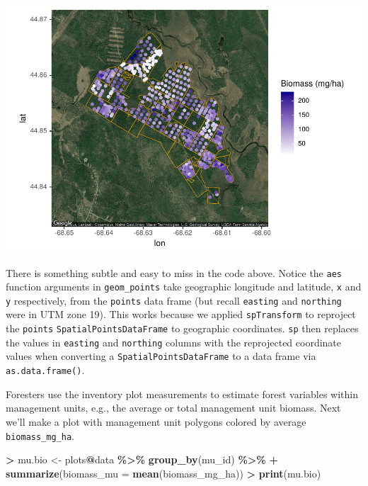 \documentclass[
]{krantz}
\makeatletter
\newenvironment{Shaded}{\begin{snugshade}}{\end{snugshade}}
\newcommand{\DataTypeTok}[1]{\textcolor[rgb]{0.27,0.27,0.27}{#1}}
\newcommand{\KeywordTok}[1]{\textcolor[rgb]{0.27,0.27,0.27}{\textbf{#1}}}
\newcommand{\NormalTok}[1]{#1}
\newcommand{\OperatorTok}[1]{\textcolor[rgb]{0.43,0.43,0.43}{\textbf{#1}}}
\newcommand{\StringTok}[1]{\textcolor[rgb]{0.5,0.5,0.5}{#1}}
\newenvironment{kframe}{%
\medskip{}
\setlength{\fboxsep}{.8em}
 \def\at@end@of@kframe{}%
 \ifinner\ifhmode%
  \def\at@end@of@kframe{\end{minipage}}%
  \begin{minipage}{\columnwidth}%
 \fi\fi%
 \def\FrameCommand##1{\hskip\@totalleftmargin \hskip-\fboxsep
 \colorbox{shadecolor}{##1}\hskip-\fboxsep
     \hskip-\linewidth \hskip-\@totalleftmargin \hskip\columnwidth}%
 \MakeFramed {\advance\hsize-\width
   \@totalleftmargin\z@ \linewidth\hsize
   \@setminipage}}%
 {\par\unskip\endMakeFramed%
 \at@end@of@kframe}
\renewenvironment{Shaded}{\begin{kframe}}{\end{kframe}}
\makeatother
\begin{document}
\includegraphics{bookdown_files/figure-latex/unnamed-chunk-205-1.pdf}

There is something subtle and easy to miss in the code above. Notice the \texttt{aes} function arguments in \texttt{geom\_points} take geographic longitude and latitude, \texttt{x} and \texttt{y} respectively, from the \texttt{points} data frame (but recall \texttt{easting} and \texttt{northing} were in UTM zone 19). This works because we applied \texttt{spTransform} to reproject the \texttt{points} \texttt{SpatialPointsDataFrame} to geographic coordinates. \texttt{sp} then replaces the values in \texttt{easting} and \texttt{northing} columns with the reprojected coordinate values when converting a \texttt{SpatialPointsDataFrame} to a data frame via \texttt{as.data.frame()}.

Foresters use the inventory plot measurements to estimate forest variables within management units, e.g., the average or total management unit biomass. Next we'll make a plot with management unit polygons colored by average \texttt{biomass\_mg\_ha}.

\begin{Shaded}
\begin{Highlighting}[]
\OperatorTok{\textgreater{}}\StringTok{ }\NormalTok{mu.bio \textless{}{-}}\StringTok{ }\NormalTok{plots}\OperatorTok{@}\NormalTok{data }\OperatorTok{\%\textgreater{}\%}\StringTok{ }\KeywordTok{group\_by}\NormalTok{(mu\_id) }\OperatorTok{\%\textgreater{}\%}\StringTok{ }
\OperatorTok{+}\StringTok{     }\KeywordTok{summarize}\NormalTok{(}\DataTypeTok{biomass\_mu =} \KeywordTok{mean}\NormalTok{(biomass\_mg\_ha))}
\OperatorTok{\textgreater{}}\StringTok{ }\KeywordTok{print}\NormalTok{(mu.bio)}
\end{Highlighting}
\end{Shaded}
\end{document}
